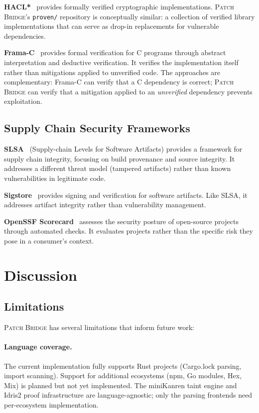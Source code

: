 \documentclass[11pt,twocolumn]{article}
\begin{document}
\textbf{HACL*}~\cite{hacl-star} provides formally verified
cryptographic implementations. \textsc{Patch Bridge}'s
\texttt{proven/} repository is conceptually similar: a collection of
verified library implementations that can serve as drop-in replacements
for vulnerable dependencies.

\textbf{Frama-C}~\cite{frama-c} provides formal verification
for C programs through abstract interpretation and deductive
verification. It verifies the implementation itself rather than
mitigations applied to unverified code. The approaches are
complementary: Frama-C can verify that a C dependency is correct;
\textsc{Patch Bridge} can verify that a mitigation applied to an
\emph{unverified} dependency prevents exploitation.

\subsection{Supply Chain Security Frameworks}

\textbf{SLSA}~\cite{slsa} (Supply-chain Levels for Software Artifacts)
provides a framework for supply chain integrity, focusing on build
provenance and source integrity. It addresses a different threat model
(tampered artifacts) rather than known vulnerabilities in legitimate
code.

\textbf{Sigstore}~\cite{sigstore} provides signing and verification
for software artifacts. Like SLSA, it addresses artifact integrity
rather than vulnerability management.

\textbf{OpenSSF Scorecard}~\cite{scorecard} assesses the security
posture of open-source projects through automated checks. It evaluates
projects rather than the specific risk they pose in a consumer's
context.

\section{Discussion}
\label{sec:discussion}

\subsection{Limitations}

\textsc{Patch Bridge} has several limitations that inform future work:

\paragraph{Language coverage.} The current implementation fully supports
Rust projects (Cargo.lock parsing, import scanning). Support for
additional ecosystems (npm, Go modules, Hex, Mix) is planned but not
yet implemented. The miniKanren taint engine and Idris2 proof
infrastructure are language-agnostic; only the parsing frontends need
per-ecosystem implementation.
\end{document}
